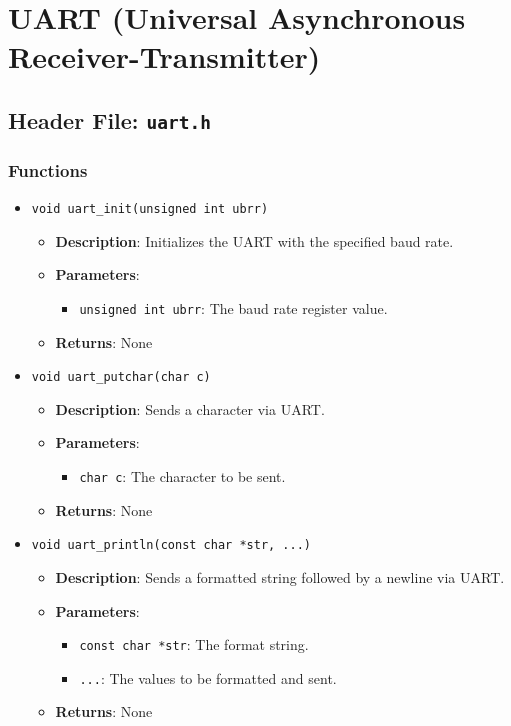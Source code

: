 \documentclass{article}
\begin{document}
\section{UART (Universal Asynchronous Receiver-Transmitter)}

\subsection{Header File: \texttt{uart.h}}

\subsubsection{Functions}

\begin{itemize}
   \item \texttt{void uart\_init(unsigned int ubrr)}
   \begin{itemize}
      \item \textbf{Description}: Initializes the UART with the specified baud rate.
      \item \textbf{Parameters}:
      \begin{itemize}
         \item \texttt{unsigned int ubrr}: The baud rate register value.
      \end{itemize}
      \item \textbf{Returns}: None
   \end{itemize}

   \item \texttt{void uart\_putchar(char c)}
   \begin{itemize}
      \item \textbf{Description}: Sends a character via UART.
      \item \textbf{Parameters}:
      \begin{itemize}
         \item \texttt{char c}: The character to be sent.
      \end{itemize}
      \item \textbf{Returns}: None
   \end{itemize}

   \item \texttt{void uart\_println(const char *str, ...)}
   \begin{itemize}
      \item \textbf{Description}: Sends a formatted string followed by a newline via UART.
      \item \textbf{Parameters}:
      \begin{itemize}
         \item \texttt{const char *str}: The format string.
         \item \texttt{...}: The values to be formatted and sent.
      \end{itemize}
      \item \textbf{Returns}: None
   \end{itemize}
\end{itemize}
\end{document}
